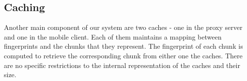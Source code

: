\subsection{Caching}
\label{sec:caching}
Another main component of our system are two caches - one in the proxy server and one in the 
mobile client. Each of them maintains a mapping between fingerprints and the chunks that they
represent. The fingerprint of each chunk is computed to retrieve the corresponding chunk from either one the caches. There
are no specific restrictions to the internal representation of the caches and their size.
